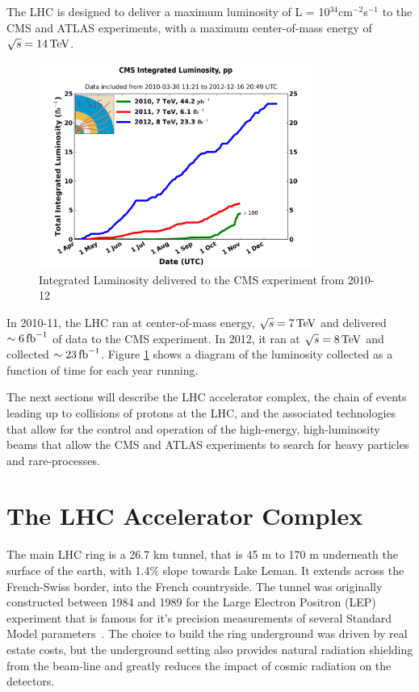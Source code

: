 \noindent The LHC is designed to deliver a maximum luminosity of L =
10$^{34}$cm$^{-2}$s$^{-1}$ to the CMS and ATLAS experiments, with a
maximum center-of-mass energy of $\sqrt{s}=14\,\text{Te\hspace{-.08em}V}$.  


\begin{figure}[h]
   \centering
  \includegraphics[width=0.8\textwidth]{Figures/Experimental_Results/CMS__int_lumi_cumulative_pp_2.png}
  \caption{Integrated Luminosity delivered to the CMS experiment from
    2010-12 \cite{LHC:Lumi_delivered}} \label{fig:cms_integrated_lumi}
\end{figure}

\par In 2010-11, the LHC ran at center-of-mass energy,
$\sqrt{s}=7\,\text{Te\hspace{-.08em}V}$ and delivered $\sim6\mbox{\ensuremath{\,\text{fb}^\text{$-$1}}}$ of data to the CMS
experiment.  In 2012, it ran at $\sqrt{s}=8\,\text{Te\hspace{-.08em}V}$ and collected
$\sim23\mbox{\ensuremath{\,\text{fb}^\text{$-$1}}}$.  Figure \ref{fig:cms_integrated_lumi} shows a diagram of
the luminosity collected as a function of time for each year running.  

\par The next sections will describe the LHC accelerator complex, the
chain of events leading up to collisions of protons at the LHC, and
the associated technologies that allow for the control and operation
of the high-energy, high-luminosity beams that allow the CMS and ATLAS
experiments to search for heavy particles and rare-processes.  


\section{The LHC Accelerator Complex}
\label{lhc_injection_chain}

\par The main LHC ring is a 26.7 km tunnel, that is 45 m to 170 m
underneath the surface of the earth, with 1.4$\%$ slope towards Lake
Leman.  It extends across the French-Swiss border, into the French
countryside.  The tunnel was originally constructed between 1984 and 1989 for
the Large Electron Positron (LEP) experiment that is famous for it's
precision measurements of several Standard Model
parameters~\cite{lhc:machine_description}.  The choice to build the
ring underground was driven by real estate costs, but the underground
setting also provides natural radiation shielding from the beam-line
and greatly reduces the impact of cosmic radiation on the detectors.  


